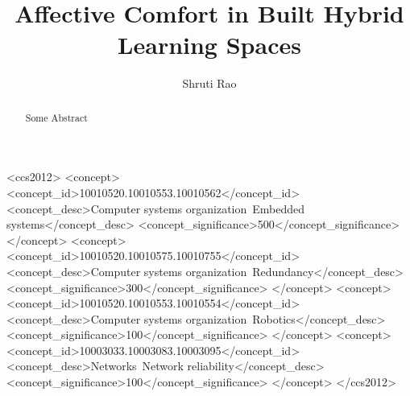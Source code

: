 \documentclass[acmconf, anonymous, review]{acmart}
\begin{document}
\title{Affective Comfort in Built Hybrid Learning Spaces}

\author{Shruti Rao}



\renewcommand{\shortauthors}{Rao et al.}

\begin{abstract}
Some Abstract
\end{abstract}


\begin{CCSXML}
<ccs2012>
 <concept>
  <concept_id>10010520.10010553.10010562</concept_id>
  <concept_desc>Computer systems organization~Embedded systems</concept_desc>
  <concept_significance>500</concept_significance>
 </concept>
 <concept>
  <concept_id>10010520.10010575.10010755</concept_id>
  <concept_desc>Computer systems organization~Redundancy</concept_desc>
  <concept_significance>300</concept_significance>
 </concept>
 <concept>
  <concept_id>10010520.10010553.10010554</concept_id>
  <concept_desc>Computer systems organization~Robotics</concept_desc>
  <concept_significance>100</concept_significance>
 </concept>
 <concept>
  <concept_id>10003033.10003083.10003095</concept_id>
  <concept_desc>Networks~Network reliability</concept_desc>
  <concept_significance>100</concept_significance>
 </concept>
</ccs2012>
\end{CCSXML}

\end{document}

